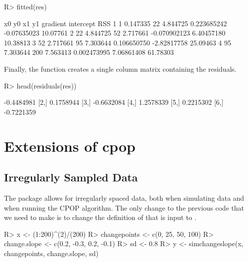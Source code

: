 \documentclass[nojss]{jss}
\begin{document}
\begin{CodeChunk}
\begin{CodeInput}
R> fitted(res)
\end{CodeInput}
\begin{CodeOutput}
  x0       y0  x1       y1     gradient   intercept      RSS
1  1 0.147335  22 4.844725  0.223685242 -0.07635023 10.07761
2 22 4.844725  52 2.717661 -0.070902123  6.40457180 10.38813
3 52 2.717661  95 7.303644  0.106650750 -2.82817758 25.09463
4 95 7.303644 200 7.563413  0.002473995  7.06861408 61.78303
\end{CodeOutput}
\end{CodeChunk}
%
%
Finally, the function   creates a single column matrix containing the residuals.
\begin{CodeChunk}
\begin{CodeInput}
R> head(residuals(res))
\end{CodeInput}
\begin{CodeOutput}
           [,1]
[1,] -0.4484981
[2,]  0.1758944
[3,] -0.6632084
[4,]  1.2578339
[5,]  0.2215302
[6,] -0.7221359
\end{CodeOutput}
\end{CodeChunk}

\section{Extensions of {cpop}} \label{sec:extensions}

\subsection{Irregularly Sampled Data}

The  package allows for irregularly spaced data, both when simulating data and when running the CPOP algorithm. The only change to the previous code that we need to make is to change the definition of  that is input to .

\begin{CodeChunk}
\begin{CodeInput}
R> x <- (1:200)^(2)/(200)
R> changepoints <- c(0, 25, 50, 100)
R> change.slope <- c(0.2, -0.3, 0.2, -0.1)
R> sd <- 0.8
R> y <- simchangeslope(x, changepoints, change.slope, sd)
\end{CodeInput}
\end{CodeChunk}
\end{document}
